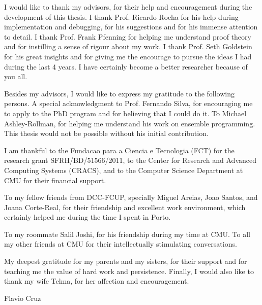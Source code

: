 I would like to thank my advisors, for their help and encouragement during the
development of this thesis. I thank Prof. Ricardo Rocha for his help during
implementation and debugging, for his suggestions and for his immense attention
to detail. I thank Prof. Frank Pfenning for helping me understand proof theory
and for instilling a sense of rigour about my work. I thank Prof. Seth Goldstein
for his great insights and for giving me the encourage to pursue the ideas I
had during the last 4 years. I have certainly become a better researcher
because of you all.

Besides my advisors, I would like to express my gratitude to the following
persons. A special acknowledgment to Prof. Fernando Silva, for encouraging me
to apply to the PhD program and for believing that I could do it.  To Michael
Ashley-Rollman, for helping me understand his work on ensemble programming.
This thesis would not be possible without his initial contribution.

I am thankful to the Fundacao para a Ciencia e Tecnologia (FCT) for the
research grant SFRH/BD/51566/2011, to the Center for Research and Advanced
Computing Systems (CRACS), and to the Computer Science Department at CMU for
their financial support.

To my fellow friends from DCC-FCUP, specially Miguel Areias, Joao Santos, and
Joana Corte-Real, for their friendship and excellent work environment, which
certainly helped me during the time I spent in Porto.

To my roommate Salil Joshi, for his friendship during my time at CMU. To all my
other friends at CMU for their intellectually stimulating conversations.

My deepest gratitude for my parents and my sisters, for their support and for
teaching me the value of hard work and persistence. Finally, I would also like
to thank my wife Telma, for her affection and encouragement.

\begin{flushright}
Flavio Cruz \\
\end{flushright}
